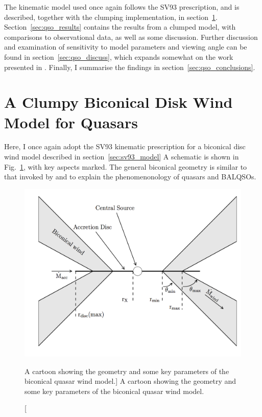The kinematic model used once again follows the SV93
prescription, and is described, together with the clumping 
implementation, in section~\ref{sec:clumpy_wind_model}.
Section~\ref{sec:qso_results} contains the results from a clumped model, 
with comparisons to observational data, as well as some discussion. 
Further discussion and examination of sensitivity to model parameters
and viewing angle can be found in section~\ref{sec:qso_discuss}, which
expands somewhat on the work presented in \citep{M16}.
Finally, I summarise the findings in section~\ref{sec:qso_conclusions}.

%
%

\section{A Clumpy Biconical Disk Wind Model for Quasars}
\label{sec:clumpy_wind_model}
Here, I once again adopt the SV93 kinematic prescription for a 
biconical disc wind model described in section~\ref{sec:sv93_model}
A schematic is shown in Fig.~\ref{fig:cartoon},
with key aspects marked. The general biconical
geometry is similar to that invoked by \cite{MCGV95} and 
\cite{elvis2000} to explain the phenomenonology
of quasars and BALQSOs.

\begin{figure} 
\centering
\includegraphics[width=1.0\textwidth]{figures/06-agnpaper/fig1.png}
\caption
[A cartoon showing the geometry and some key parameters of
the biconical quasar wind model.]
{
A cartoon showing the geometry and some key parameters of
the biconical quasar wind model.
}
\label{fig:cartoon}
\end{figure} 

